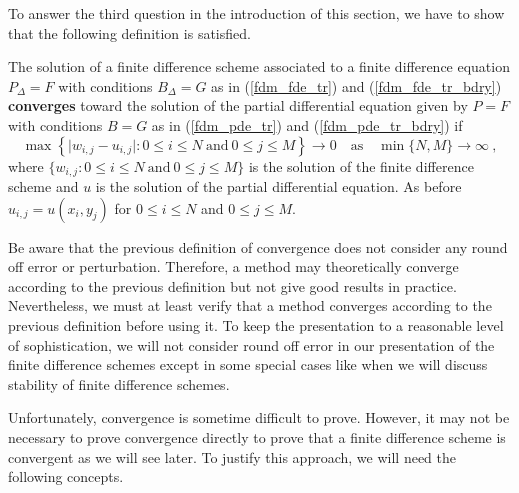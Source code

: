 To answer the third question in the introduction of this section, we
have to show that the following definition is satisfied.

\begin{defn} \label{fdm_conv_def}
The solution of a finite difference scheme associated to a finite
difference equation $P_\Delta = F$ with conditions $B_\Delta = G$
as in (\ref{fdm_fde_tr}) and (\ref{fdm_fde_tr_bdry})
{\bfseries converges} toward
the solution of the partial differential equation given by
$P = F$ with conditions $B = G$ as in (\ref{fdm_pde_tr}) and
(\ref{fdm_pde_tr_bdry}) if
\[
\max \left\{ \big| w_{i,j} - u_{i,j} \big| : 0\leq i \leq N \ 
\text{and} \ 0\leq j\leq M \right\} \rightarrow 0 \quad \text{as}
\quad \min \{N, M\} \rightarrow \infty \ ,
\]
where $\{w_{i,j} : 0 \leq i \leq N \ \text{and} \ 0 \leq j \leq M\}$
is the solution of the finite difference scheme and $u$ is the
solution of the partial differential equation.
As before $\displaystyle u_{i,j} = u\left(x_i,y_j\right)$ for
$0\leq i \leq N$ and $0\leq j \leq M$.
\end{defn}

\begin{rmk}
Be aware that the previous definition of convergence does not consider
any round off error or perturbation.  Therefore, a method may
theoretically converge according to the previous definition but not
give good results in practice.  Nevertheless, we must at least verify
that a method converges according to the previous definition before
using it.  To keep the presentation to a reasonable level of
sophistication, we will not consider round off error in our
presentation of the finite difference schemes except in some special
cases like when we will discuss stability of finite difference
schemes.
\end{rmk}

Unfortunately, convergence is sometime difficult to prove.  However, it
may not be necessary to prove convergence directly to prove that a
finite difference scheme is convergent as we will see later.  To
justify this approach, we will need the following concepts.

